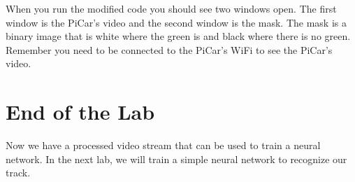 \documentclass[11pt]{report}
\begin{document}
When you run the modified code you should see two windows open. The first window is the PiCar's video and the second window is the mask. The mask is a binary image that is white where the green is and black where there is no green. Remember you need to be connected to the PiCar's WiFi to see the PiCar's video.


\chapter{End of the Lab}
Now we have a processed video stream that can be used to train a neural network. In the next lab, we will train a simple neural network to recognize our track.
\end{document}
